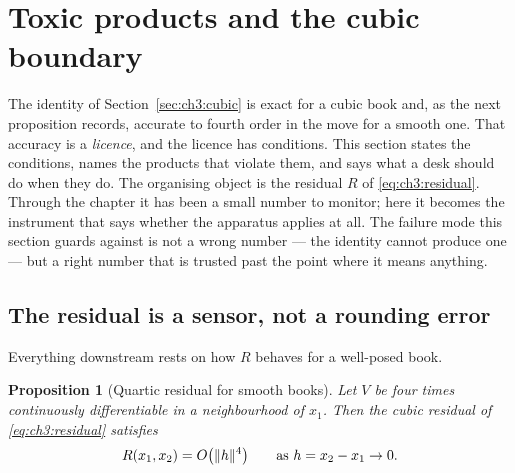 \documentclass[11pt]{book}
\theoremstyle{plain}
\newtheorem{proposition}[theorem]{Proposition}
\theoremstyle{definition}
\theoremstyle{remark}
\DeclarePairedDelimiter{\norm}{\lVert}{\rVert}
\begin{document}
\section{Toxic products and the cubic boundary}\label{sec:ch3:toxic}

The identity of Section~\ref{sec:ch3:cubic} is exact for a cubic book and, as
the next proposition records, accurate to fourth order in the move for a
smooth one. That accuracy is a \emph{licence}, and the licence has conditions.
This section states the conditions, names the products that violate them, and
says what a desk should do when they do. The organising object is the residual
$R$ of \eqref{eq:ch3:residual}. Through the chapter it has been a small number
to monitor; here it becomes the instrument that says whether the apparatus
applies at all. The failure mode this section guards against is not a wrong
number --- the identity cannot produce one --- but a right number that is
trusted past the point where it means anything.

\subsection{The residual is a sensor, not a rounding error}
\label{sec:ch3:residual-sensor}

Everything downstream rests on how $R$ behaves for a well-posed book.

\begin{proposition}[Quartic residual for smooth books]\label{prop:ch3:quartic}
Let $V$ be four times continuously differentiable in a neighbourhood of $x_1$.
Then the cubic residual of \eqref{eq:ch3:residual} satisfies
\[
  R(x_1, x_2) = O\bigl(\norm{h}^4\bigr) \qquad \text{as } h = x_2 - x_1 \to 0 .
\]
\end{proposition}
\end{document}
